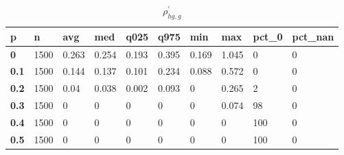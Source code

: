 \begin{table}[h]
 \centering 
\footnotesize
\caption{$\rho_{hg,g}^\prime $}
\label{tab:alphahgg}
\begin{tabular}[h]{|l|l|l|l|l|l|l|l|l|l|
    } \hline
\textbf{ p} & \textbf{ n} & \textbf{ avg} & \textbf{ med} & \textbf{ q025} & \textbf{ q975} & \textbf{ min} & \textbf{ max} & \textbf{ pct\_0} & \textbf{ pct\_nan}
    \\ \hline
  \textbf{  0} & 1500 & 0.263 & 0.254 & 0.193 & 0.395 & 0.169 & 1.045 &   0 & 0
    \\ \hline
  \textbf{0.1} & 1500 & 0.144 & 0.137 & 0.101 & 0.234 & 0.088 & 0.572 &   0 & 0
    \\ \hline
  \textbf{0.2} & 1500 &  0.04 & 0.038 & 0.002 & 0.093 &     0 & 0.265 &   2 & 0
    \\ \hline
  \textbf{0.3} & 1500 &     0 &     0 &     0 &     0 &     0 & 0.074 &  98 & 0
    \\ \hline
  \textbf{0.4} & 1500 &     0 &     0 &     0 &     0 &     0 &     0 & 100 & 0
    \\ \hline
  \textbf{0.5} & 1500 &     0 &     0 &     0 &     0 &     0 &     0 & 100 & 0
    \\ \hline
 \end{tabular}
 \end{table}
